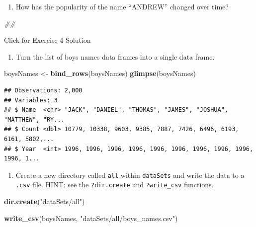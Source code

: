 \documentclass[]{book}
\newenvironment{Shaded}{\begin{snugshade}}{\end{snugshade}}
\newcommand{\CommentTok}[1]{\textcolor[rgb]{0.56,0.35,0.01}{\textit{#1}}}
\newcommand{\KeywordTok}[1]{\textcolor[rgb]{0.13,0.29,0.53}{\textbf{#1}}}
\newcommand{\NormalTok}[1]{#1}
\newcommand{\StringTok}[1]{\textcolor[rgb]{0.31,0.60,0.02}{#1}}
\providecommand{\tightlist}{%
  \setlength{\itemsep}{0pt}\setlength{\parskip}{0pt}}
\begin{document}
\begin{enumerate}
\def\labelenumi{\arabic{enumi}.}
\setcounter{enumi}{3}
\tightlist
\item
  How has the popularity of the name ``ANDREW'' changed over time?
\end{enumerate}

\begin{Shaded}
\begin{Highlighting}[]
\CommentTok{## }
\end{Highlighting}
\end{Shaded}

{Click for Exercise 4 Solution}

\begin{enumerate}
\def\labelenumi{\arabic{enumi}.}
\tightlist
\item
  Turn the list of boys names data frames into a single data frame.
\end{enumerate}

\begin{Shaded}
\begin{Highlighting}[]
\NormalTok{boysNames <-}\StringTok{ }\KeywordTok{bind_rows}\NormalTok{(boysNames)}
\KeywordTok{glimpse}\NormalTok{(boysNames)}
\end{Highlighting}
\end{Shaded}

\begin{verbatim}
## Observations: 2,000
## Variables: 3
## $ Name  <chr> "JACK", "DANIEL", "THOMAS", "JAMES", "JOSHUA", "MATTHEW", "RY...
## $ Count <dbl> 10779, 10338, 9603, 9385, 7887, 7426, 6496, 6193, 6161, 5802,...
## $ Year  <int> 1996, 1996, 1996, 1996, 1996, 1996, 1996, 1996, 1996, 1996, 1...
\end{verbatim}

\begin{enumerate}
\def\labelenumi{\arabic{enumi}.}
\setcounter{enumi}{1}
\tightlist
\item
  Create a new directory called \texttt{all} within \texttt{dataSets} and write the data to a \texttt{.csv} file. HINT: see the \texttt{?dir.create} and \texttt{?write\_csv} functions.
\end{enumerate}

\begin{Shaded}
\begin{Highlighting}[]
\KeywordTok{dir.create}\NormalTok{(}\StringTok{"dataSets/all"}\NormalTok{)}

\KeywordTok{write_csv}\NormalTok{(boysNames, }\StringTok{"dataSets/all/boys_names.csv"}\NormalTok{)}
\end{Highlighting}
\end{Shaded}
\end{document}
